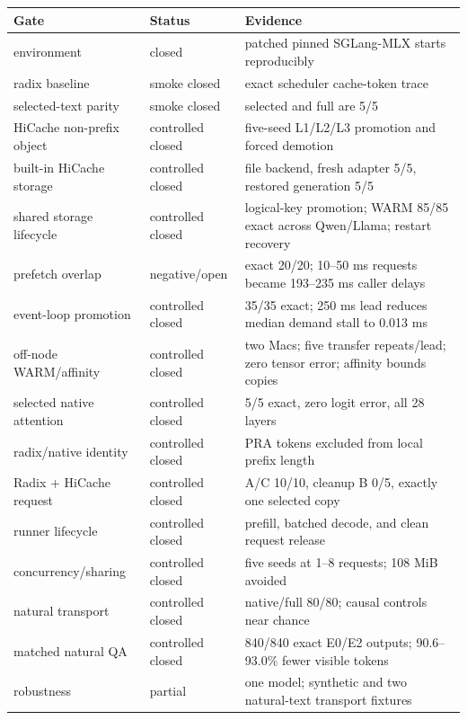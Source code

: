 \documentclass[10pt]{article}
\begin{document}
\FloatBarrier
\begin{center}
\begin{tabularx}{0.96\linewidth}{l l Y}
\toprule
Gate & Status & Evidence \\
\midrule
environment & closed & patched pinned SGLang-MLX starts reproducibly \\
radix baseline & smoke closed & exact scheduler cache-token trace \\
selected-text parity & smoke closed & selected and full are 5/5 \\
HiCache non-prefix object & controlled closed & five-seed L1/L2/L3 promotion and forced demotion \\
built-in HiCache storage & controlled closed & file backend, fresh adapter 5/5, restored generation 5/5 \\
shared storage lifecycle & controlled closed & logical-key promotion; WARM 85/85 exact across Qwen/Llama; restart recovery \\
prefetch overlap & negative/open & exact 20/20; 10--50 ms requests became 193--235 ms caller delays \\
event-loop promotion & controlled closed & 35/35 exact; 250 ms lead reduces median demand stall to 0.013 ms \\
off-node WARM/affinity & controlled closed & two Macs; five transfer repeats/lead; zero tensor error; affinity bounds copies \\
selected native attention & controlled closed & 5/5 exact, zero logit error, all 28 layers \\
radix/native identity & controlled closed & PRA tokens excluded from local prefix length \\
Radix + HiCache request & controlled closed & A/C 10/10, cleanup B 0/5, exactly one selected copy \\
runner lifecycle & controlled closed & prefill, batched decode, and clean request release \\
concurrency/sharing & controlled closed & five seeds at 1--8 requests; 108 MiB avoided \\
natural transport & controlled closed & native/full 80/80; causal controls near chance \\
matched natural QA & controlled closed & 840/840 exact E0/E2 outputs; 90.6--93.0\% fewer visible tokens \\
robustness & partial & one model; synthetic and two natural-text transport fixtures \\
\bottomrule
\end{tabularx}
\end{center}
\end{document}
